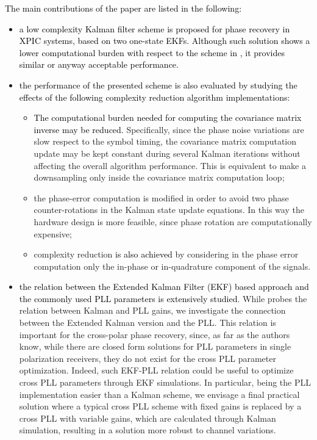 \textcolor{black}{The main contributions of the paper are listed in the following:}
\begin{itemize}
	
	\item \textcolor{black}{a low complexity Kalman filter scheme is proposed for phase recovery in XPIC systems, based on two one-state EKFs. Although such solution shows a lower computational burden with respect to the scheme in \cite{CommLett}, it provides similar or anyway acceptable performance.}
	\item \textcolor{black}{the performance of the presented scheme is also evaluated by studying the effects of the following complexity reduction algorithm implementations:}
	\begin{itemize} 
	\item \textcolor{black}{The computational burden needed for computing the covariance matrix inverse may be reduced.} Specifically, since the phase noise variations are slow respect to the symbol timing, the covariance matrix computation update may be kept constant during several Kalman iterations without affecting the overall algorithm performance. This is equivalent to make a downsampling only inside the covariance matrix computation loop; 
		\item the phase-error computation is modified in order to avoid two phase counter-rotations in the Kalman state update equations. In this way the hardware design is more feasible, since phase rotation are computationally expensive;
		\item complexity reduction \textcolor{black}{is also achieved} by considering in the phase error computation only the in-phase or in-quadrature component of the signals.
	\end{itemize}

	 	\item \textcolor{black}{the relation between the Extended Kalman Filter (EKF) based approach and the commonly used PLL parameters is extensively studied}. While \cite{Patapoutian} probes the relation between Kalman and PLL gains, we investigate the connection between the Extended Kalman version and the PLL. This relation is important for the cross-polar phase recovery, since, as far as the authors know, while there are closed form solutions for PLL parameters in single polarization receivers, they do not exist for the cross PLL parameter optimization. Indeed, such EKF-PLL relation could be useful to optimize cross PLL parameters through EKF simulations. In particular, being the PLL implementation easier than a Kalman scheme, we envisage a final practical solution where a typical cross PLL scheme with fixed gains is replaced by a cross PLL with variable gains, which are calculated through Kalman simulation, resulting in a solution more robust to channel variations.
\end{itemize}


